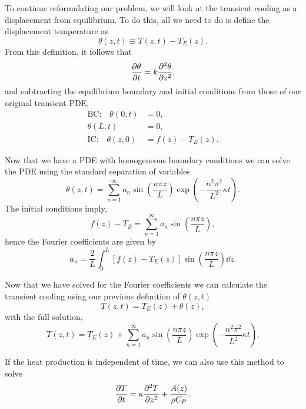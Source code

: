 To continue reformulating our problem, we will look at the transient cooling as a displacement from equilibrium.  To do this, all we need to do is define the displacement temperature as
\begin{equation}
    \theta(z,t) \equiv T(z,t) - T_E(z) .
\end{equation}
From this definition, it follows that
\begin{equation}
    \pdv{\theta}{t} = k \pdv[2]{\theta}{z} ,
\end{equation}
and subtracting the equilibrium boundary and initial conditions from those
of our original transient PDE,
\begin{align}
    \text{BC:} \quad \theta(0,t) &= 0 , \\
    \theta(L,t) &= 0 , \\
    \text{IC:} \quad \theta(z,0) &= f(z) - T_E(z) .
\end{align}

Now that we have a PDE with homogeneous boundary conditions we can solve the PDE using the standard separation of variables
\begin{equation}
    \theta(z,t) = \sum_{n=1}^\infty a_n \sin \left( \frac{n \pi z}{L} \right)
    \exp \left( - \frac{n^2 \pi^2}{L^2} \kappa t \right) .
\end{equation}
The initial conditions imply,
\begin{equation*}
    f(z) - T_E = \sum_{n=1}^\infty a_n \sin \left( \frac{n \pi z}{L} \right) ,
\end{equation*}
hence the Fourier coefficients are given by
\begin{equation}
    a_n = \frac{2}{L} 
        \int_0^L [f(z) - T_E(z)] \sin \left( \frac{n \pi z}{L} \right) \dd{z} .
\end{equation}

Now that we have solved for the Fourier coefficients we can calculate the transient cooling using our previous definition of $\theta(z,t)$
\begin{equation}
    T(z,t) = T_E(z) + \theta(z),
\end{equation}
with the full solution,
\begin{equation}
    T(z,t) = T_E(z) + \sum_{n=1}^\infty a_n \sin \left( \frac{n \pi z}{L}
    \right) \exp \left( - \frac{n^2 \pi^2}{L^2} \kappa t \right) .
\end{equation}

If the heat production is independent of time, we can also use this method to solve
\begin{equation}
    \pdv{T}{t} = \kappa \pdv[2]{T}{z} + \frac{A(z)}{\rho C_P} .
\end{equation}


